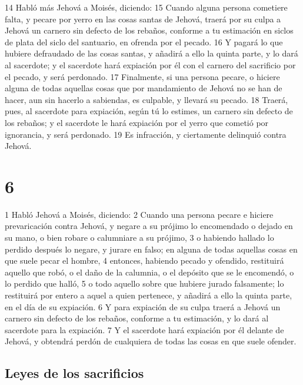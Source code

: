 14 Habló más Jehová a Moisés, diciendo:
15 Cuando alguna persona cometiere falta, y pecare por yerro en las cosas santas de Jehová, traerá por su culpa a Jehová un carnero sin defecto de los rebaños, conforme a tu estimación en siclos de plata   del siclo del santuario, en ofrenda por el pecado.
16 Y pagará lo que hubiere defraudado de las cosas santas, y añadirá a ello la quinta parte, y lo dará al sacerdote; y el sacerdote hará expiación por él con el carnero del sacrificio por el pecado, y será perdonado.
17 Finalmente, si una persona pecare, o hiciere alguna de todas aquellas cosas que por mandamiento de Jehová no se han de hacer, aun sin hacerlo a sabiendas, es culpable, y llevará su pecado.
18 Traerá, pues, al sacerdote para expiación, según tú lo estimes, un carnero sin defecto de los rebaños; y el sacerdote le hará expiación por el yerro que cometió por ignorancia, y será perdonado.
19 Es infracción, y ciertamente delinquió contra Jehová.

\chapter{6}

1 Habló Jehová a Moisés, diciendo:
2 Cuando una persona pecare e hiciere prevaricación contra Jehová, y negare a su prójimo lo encomendado o dejado en su mano, o bien robare o calumniare a su prójimo,
3 o habiendo hallado lo perdido después lo negare, y jurare en falso; en alguna de todas aquellas cosas en que suele pecar el hombre,
4 entonces, habiendo pecado y ofendido, restituirá aquello que robó, o el daño de la calumnia, o el depósito que se le encomendó, o lo perdido que halló,
5 o todo aquello sobre que hubiere jurado falsamente; lo restituirá por entero a aquel a quien pertenece, y añadirá a ello la quinta parte, en el día de su expiación.
6 Y para expiación de su culpa traerá a Jehová un carnero sin defecto de los rebaños, conforme a tu estimación, y lo dará al sacerdote para la expiación.
7 Y el sacerdote hará expiación por él delante de Jehová, y obtendrá perdón de cualquiera de todas las cosas en que suele ofender.

\section*{Leyes de los sacrificios}

